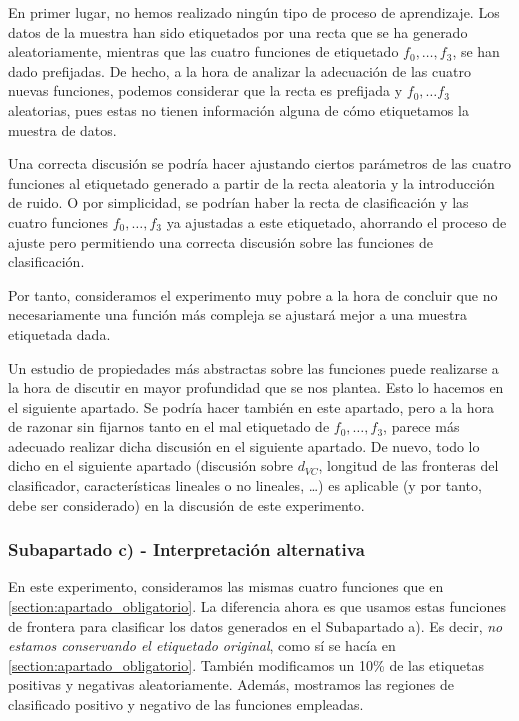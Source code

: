 \documentclass[11pt]{article}
\begin{document}
En primer lugar, no hemos realizado ningún tipo de proceso de aprendizaje. Los datos de la muestra han sido etiquetados por una recta que se ha generado aleatoriamente, mientras que las cuatro funciones de etiquetado $f_0, \ldots, f_3$, se han dado prefijadas. De hecho, a la hora de analizar la adecuación de las cuatro nuevas funciones, podemos considerar que la recta es prefijada y $f_0, \ldots f_3$ aleatorias, pues estas no tienen información alguna de cómo etiquetamos la muestra de datos.

Una correcta discusión se podría hacer ajustando ciertos parámetros de las cuatro funciones al etiquetado generado a partir de la recta aleatoria y la introducción de ruido. O por simplicidad, se podrían haber la recta de clasificación y las cuatro funciones $f_0, \ldots, f_3$ ya ajustadas a este etiquetado, ahorrando el proceso de ajuste pero permitiendo una correcta discusión sobre las funciones de clasificación.

Por tanto, consideramos el experimento muy pobre a la hora de concluir que no necesariamente una función más compleja se ajustará mejor a una muestra etiquetada dada.

Un estudio de propiedades más abstractas sobre las funciones puede realizarse a la hora de discutir en mayor profundidad que se nos plantea. Esto lo hacemos en el siguiente apartado. Se podría hacer también en este apartado, pero a la hora de razonar sin fijarnos tanto en el mal etiquetado de $f_0, \ldots, f_3$, parece más adecuado realizar dicha discusión en el siguiente apartado. De nuevo, todo lo dicho en el siguiente apartado (discusión sobre $d_{VC}$, longitud de las fronteras del clasificador, características lineales o no lineales, \ldots) es aplicable (y por tanto, debe ser considerado) en la discusión de este experimento.

\subsubsection{Subapartado c) - Interpretación alternativa} \label{section:apartado_extra}

En este experimento, consideramos las mismas cuatro funciones que en \ref{section:apartado_obligatorio}. La diferencia ahora es que usamos estas funciones de frontera para clasificar los datos generados en el Subapartado a). Es decir, \emph{no estamos conservando el etiquetado original}, como sí se hacía en \ref{section:apartado_obligatorio}. También modificamos un 10\% de las etiquetas positivas y negativas aleatoriamente. Además, mostramos las regiones de clasificado positivo y negativo de las funciones empleadas.
\end{document}
